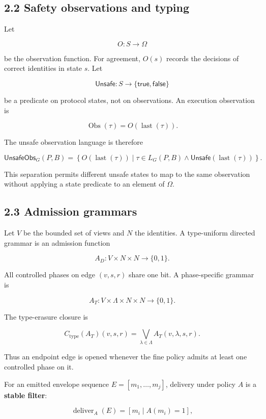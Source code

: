 \subsection{2.2 Safety observations and
typing}\label{safety-observations-and-typing}

Let

\[
O:S\to\Omega
\]

be the observation function. For agreement, \(O(s)\) records the
decisions of correct identities in state \(s\). Let

\[
\mathsf{Unsafe}:S\to\{\mathsf{true},\mathsf{false}\}
\]

be a predicate on protocol states, not on observations. An execution
observation is

\[
\operatorname{Obs}(\tau)=O(\operatorname{last}(\tau)).
\]

The unsafe observation language is therefore

\[
\mathsf{UnsafeObs}_G(P,B)=
\left\{
O(\operatorname{last}(\tau))
\mid
\tau\in L_G(P,B)\land
\mathsf{Unsafe}(\operatorname{last}(\tau))
\right\}.
\]

This separation permits different unsafe states to map to the same
observation without applying a state predicate to an element of
\(\Omega\).

\subsection{2.3 Admission grammars}\label{admission-grammars}

Let \(V\) be the bounded set of views and \(N\) the identities. A
type-uniform directed grammar is an admission function

\[
A_D:V\times N\times N\to\{0,1\}.
\]

All controlled phases on edge \((v,s,r)\) share one bit. A
phase-specific grammar is

\[
A_T:V\times\Lambda\times N\times N\to\{0,1\}.
\]

The type-erasure closure is

\[
C_{\mathrm{type}}(A_T)(v,s,r)
=
\bigvee_{\lambda\in\Lambda}A_T(v,\lambda,s,r).
\]

Thus an endpoint edge is opened whenever the fine policy admits at least
one controlled phase on it.

For an emitted envelope sequence \(E=[m_1,\ldots,m_j]\), delivery under
policy \(A\) is a \textbf{stable filter}:

\[
\operatorname{deliver}_A(E)
=
[m_i\mid A(m_i)=1],
\]

